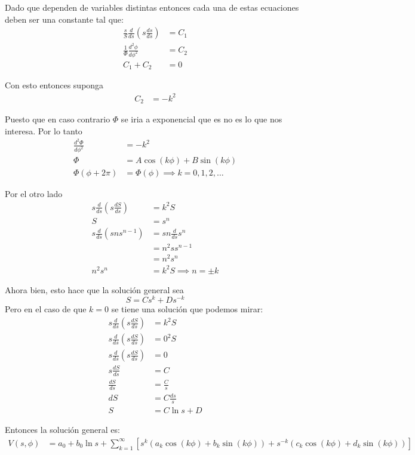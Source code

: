 \documentclass{report}
\begin{document}
Dado que dependen de variables distintas entonces cada una de estas ecuaciones deben ser una constante tal que:
\begin{align*}
	\frac{s}{S}\frac{d}{ds} \left( s \frac{ds}{ds} \right) &= C_1\\
	\frac{1}{\Phi}\frac{d^2\phi}{d\phi^2} &= C_2\\
	C_1 + C_2 &= 0
\end{align*}

Con esto entonces suponga
\begin{align*}
	C_2 &= -k^2
\end{align*}

Puesto que en caso contrario $\Phi$ se iria a exponencial que es no es lo que nos interesa.
Por lo tanto
\begin{align*}
	\frac{d^2 \Phi}{d\phi^2} &= -k^2\\
	\Phi &= A\cos\left(k\phi\right) + B \sin \left( k\phi \right)\\
	\Phi(\phi + 2\pi) &= \Phi(\phi) \implies k = 0, 1, 2, \ldots
\end{align*}

Por el otro lado
\begin{align*}
	s \frac{d}{ds}\left( s \frac{d S}{ds} \right) &= k^2 S\\
	S &= s^n\\
	s \frac{d}{ds}\left( s n s^{n - 1} \right) &= sn\frac{d}{ds} s^n\\
	&= n^2 s s^{n - 1}\\
	&= n^2 s^n\\
	n^2 s^n &= k^2 S \implies n = \pm k
\end{align*}

Ahora bien, esto hace que la solución general sea \[
	S = C s^k + D s^{-k}
\] Pero en el caso de que $k = 0$ se tiene una solución que podemos mirar:
\begin{align*}
	s \frac{d}{ds}\left( s \frac{d S}{ds} \right) &= k^2 S\\
	s \frac{d}{ds}\left( s \frac{d S}{ds} \right) &= 0^2 S\\
	s \frac{d}{ds}\left( s \frac{d S}{ds} \right) &= 0\\
	s \frac{d S}{ds} &= C\\
	\frac{d S}{ds} &= \frac{C}{s}\\
	d S &= C\frac{ds}{s}\\
	S &= C\ln s + D
\end{align*}

Entonces la solución general es:
\begin{align*}
	V \left( s, \phi \right) &= a_0 + b_0 \ln s + \sum_{k = 1}^{\infty} \left[ s^k \left( a_k \cos \left( k\phi \right) + b_k \sin \left( k\phi \right)\right) + s^{-k} \left( c_k \cos \left( k\phi \right) + d_k \sin \left( k\phi \right)\right)\right]
\end{align*}
\end{document}
